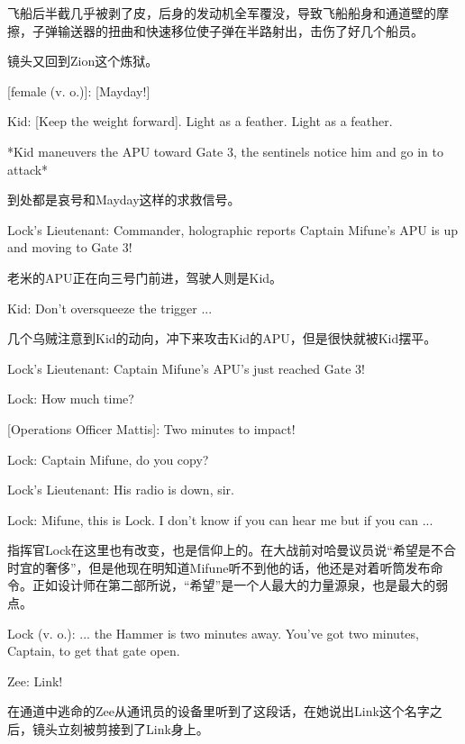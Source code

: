 \documentclass[UTF8]{ctexart}
\newenvironment{myquote}{\color{green} \setlength{\leftskip}{6em} \setlength{\rightskip}{4em} \setlength{\parindent}{-2em}}{\par}
\begin{document}
飞船后半截几乎被剥了皮，后身的发动机全军覆没，导致飞船船身和通道壁的摩擦，子弹输送器的扭曲和快速移位使子弹在半路射出，击伤了好几个船员。

镜头又回到Zion这个炼狱。

\begin{myquote}
[female (v. o.)]: [Mayday!]

Kid: [Keep the weight forward]. Light as a feather. Light as a feather.

*Kid maneuvers the APU toward Gate 3, the sentinels notice him and go in to attack*
\end{myquote}

到处都是哀号和Mayday这样的求救信号。

\begin{myquote}
Lock's Lieutenant: Commander, holographic reports Captain Mifune's APU is up and moving to Gate 3!
\end{myquote}

老米的APU正在向三号门前进，驾驶人则是Kid。

\begin{myquote}
Kid: Don't oversqueeze the trigger ...
\end{myquote}

几个乌贼注意到Kid的动向，冲下来攻击Kid的APU，但是很快就被Kid摆平。

\begin{myquote}
Lock's Lieutenant: Captain Mifune's APU's just reached Gate 3!

Lock: How much time?

[Operations Officer Mattis]: Two minutes to impact!

Lock: Captain Mifune, do you copy?

Lock's Lieutenant: His radio is down, sir.

Lock: Mifune, this is Lock. I don't know if you can hear me but if you can ...
\end{myquote}

指挥官Lock在这里也有改变，也是信仰上的。在大战前对哈曼议员说“希望是不合时宜的奢侈”，但是他现在明知道Mifune听不到他的话，他还是对着听筒发布命令。正如设计师在第二部所说，“希望”是一个人最大的力量源泉，也是最大的弱点。

\begin{myquote}
Lock (v. o.): ... the Hammer is two minutes away. You've got two minutes, Captain, to get that gate open.

Zee: Link!
\end{myquote}

在通道中逃命的Zee从通讯员的设备里听到了这段话，在她说出Link这个名字之后，镜头立刻被剪接到了Link身上。
\end{document}
